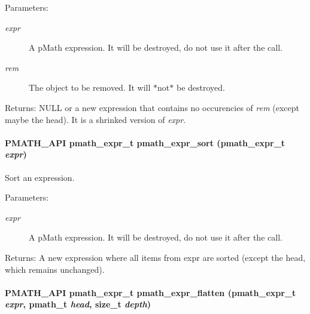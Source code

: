 \begin{Desc}
\item[Parameters:]
\begin{description}
\item[{\em expr}]A pMath expression. It will be destroyed, do not use it after the call. \item[{\em rem}]The object to be removed. It will $\ast$not$\ast$ be destroyed. \end{description}
\end{Desc}
\begin{Desc}
\item[Returns:]NULL or a new expression that contains no occurencies of {\em rem\/} (except maybe the head). It is a shrinked version of {\em expr\/}. \end{Desc}
\hypertarget{group__expressions_gb3708a99c95943b062a91797d340dd7b}{
\paragraph[{pmath\_\-expr\_\-sort}]{\setlength{\rightskip}{0pt plus 5cm}PMATH\_\-API {\bf pmath\_\-expr\_\-t} pmath\_\-expr\_\-sort ({\bf pmath\_\-expr\_\-t} {\em expr})}\hfill}
\label{group__expressions_gb3708a99c95943b062a91797d340dd7b}


Sort an expression. 

\begin{Desc}
\item[Parameters:]
\begin{description}
\item[{\em expr}]A pMath expression. It will be destroyed, do not use it after the call. \end{description}
\end{Desc}
\begin{Desc}
\item[Returns:]A new expression where all items from expr are sorted (except the head, which remains unchanged). \end{Desc}
\hypertarget{group__expressions_g9162f7fe8a42627c5adf6185dba9e67d}{
\paragraph[{pmath\_\-expr\_\-flatten}]{\setlength{\rightskip}{0pt plus 5cm}PMATH\_\-API {\bf pmath\_\-expr\_\-t} pmath\_\-expr\_\-flatten ({\bf pmath\_\-expr\_\-t} {\em expr}, \/  {\bf pmath\_\-t} {\em head}, \/  size\_\-t {\em depth})}\hfill}
\label{group__expressions_g9162f7fe8a42627c5adf6185dba9e67d}


